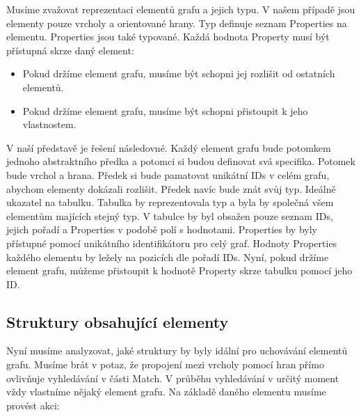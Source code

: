 Musíme zvažovat reprezentaci elementů grafu a jejich typu.
V našem případě jsou elementy pouze vrcholy a orientované hrany.
Typ definuje seznam Properties na elementu. 
Properties jsou také typované.
Každá hodnota Property musí být přístupná skrze daný element:

\begin{itemize}

\item Pokud držíme element grafu, musíme být schopni jej rozlišit od ostatních elementů.

\item Pokud držíme element grafu, musíme být schopni přistoupit k jeho vlastnostem.

\end{itemize}

\clearpage

V naší představě je řešení následovné.
Každý element grafu bude potomkem jednoho abstraktního předka a potomci si budou definovat svá specifika.
Potomek bude vrchol a hrana.
Předek si bude pamatovat unikátní IDs v celém grafu, abychom elementy dokázali rozlišit. 
Předek navíc bude znát svůj typ. 
Ideálně ukazatel na tabulku.
Tabulka by reprezentovala typ a byla by společná všem elementům majících stejný typ.
V tabulce by byl obsažen pouze seznam IDs, jejich pořadí a Properties v podobě polí s hodnotami.
Properties by byly přístupné pomocí unikátního identifikátoru pro celý graf.
Hodnoty Properties každého elementu by ležely na pozicích dle pořadí IDs.
Nyní, pokud držíme element grafu, můžeme přistoupit k hodnotě Property skrze tabulku pomocí jeho ID.    

\subsection{Struktury obsahující elementy}

Nyní musíme analyzovat, jaké struktury by byly idální pro uchovávání elementů grafu.
Musíme brát v potaz, že propojení mezi vrcholy pomocí hran přímo ovlivňuje vyhledávání v části Match.
V průběhu vyhledávání v určitý moment vždy vlastníme nějaký element grafu.
Na základě daného elementu musíme provést akci:

